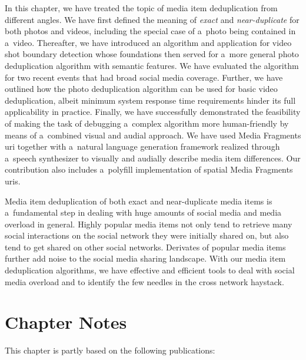 In this chapter, we have treated the topic of media item deduplication
from different angles.
We have first defined the meaning of \emph{exact} and \emph{near-duplicate} 
for both photos and videos,
including the special case of a~photo being contained in a~video.
Thereafter, we have introduced an algorithm and application
for video shot boundary detection
whose foundations then served for a~more general
photo deduplication algorithm with semantic features.
We have evaluated the algorithm for two recent events
that had broad social media coverage.
Further, we have outlined how the photo deduplication algorithm
can be used for basic video deduplication,
albeit minimum system response time requirements
hinder its full applicability in practice.
Finally, we have successfully demonstrated the feasibility
of making the task of debugging a~complex algorithm
more human-friendly by means of a~combined visual and audial approach.
We have used Media Fragments {\sc uri}
together with a~natural language generation framework
realized through a~speech synthesizer to visually and audially
describe media item differences.
Our contribution also includes a~polyfill implementation
of spatial Media Fragments {\sc uri}s.

Media item deduplication of both exact and near-duplicate media items
is a~fundamental step in dealing with huge amounts of social media
and media overload in general.
Highly popular media items not only tend
to retrieve many social interactions on the social network
they were initially shared on, but also tend to get shared
on other social networks.
Derivates of popular media items further add noise
to the social media sharing landscape.
With our media item deduplication algorithms, 
we have effective and efficient tools to deal with social media overload
and to identify the few needles in the cross network haystack. 

\section*{Chapter Notes}
This chapter is partly based on the following publications:



